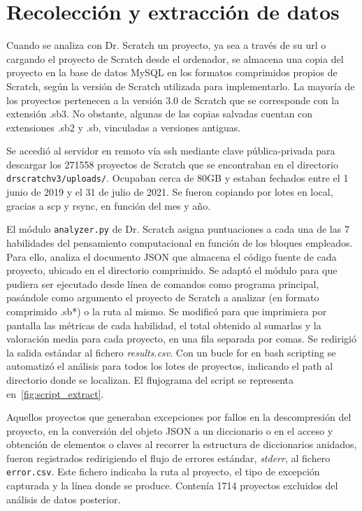 \documentclass[a4paper, 12pt]{book}
\begin{document}
\section{Recolección y extracción de datos}  
\label{sec:collect_data}

Cuando se analiza con Dr. Scratch un proyecto, ya sea a través de su url o cargando el proyecto de Scratch desde el ordenador, se almacena una copia del proyecto en la base de datos MySQL en los formatos comprimidos propios de Scratch, según la versión de Scratch utilizada para implementarlo. La mayoría de los proyectos pertenecen a la versión 3.0 de Scratch que se corresponde con la extensión .sb3. No obstante, algunas de las copias salvadas cuentan con extensiones .sb2 y .sb, vinculadas a versiones antiguas. 

Se accedió al servidor en remoto vía ssh mediante clave pública-privada para descargar los 271558 proyectos de Scratch que se encontraban en el directorio \texttt{drscratchv3/uploads/}. Ocupaban cerca de 80GB y estaban fechados entre el 1 junio de 2019 y el 31 de julio de 2021. Se fueron copiando por lotes en local, gracias a scp y rsync, en función del mes y año. 

El módulo \texttt{analyzer.py} de Dr. Scratch asigna puntuaciones a cada una de las 7 habilidades del pensamiento computacional en función de los bloques empleados. Para ello, analiza el documento JSON que almacena el código fuente de cada proyecto, ubicado en el directorio comprimido. Se adaptó el módulo para que pudiera ser ejecutado desde línea de comandos como programa principal, pasándole como argumento el proyecto de Scratch a analizar (en formato comprimido .sb*) o la ruta al mismo. Se modificó para que imprimiera por pantalla las métricas de cada habilidad, el total obtenido al sumarlas y la valoración media para cada proyecto, en una fila separada por comas. Se redirigió la salida estándar al fichero \emph{results.csv}.  
Con un bucle for en bash scripting se automatizó el análisis para todos los lotes de proyectos, indicando el path al directorio donde se localizan. El flujograma del script se representa en~\ref{fig:script_extract}.

Aquellos proyectos que generaban excepciones por fallos en la descompresión del proyecto, en la conversión del objeto JSON a un diccionario o en el acceso y obtención de elementos o claves al recorrer la estructura de diccionarios anidados, fueron registrados redirigiendo el flujo de errores estándar, \emph{stderr}, al fichero \texttt{error.csv}. Este fichero indicaba la ruta al proyecto, el tipo de excepción capturada y la línea donde se produce. Contenía 1714 proyectos excluidos del análisis de datos posterior.
\end{document}

